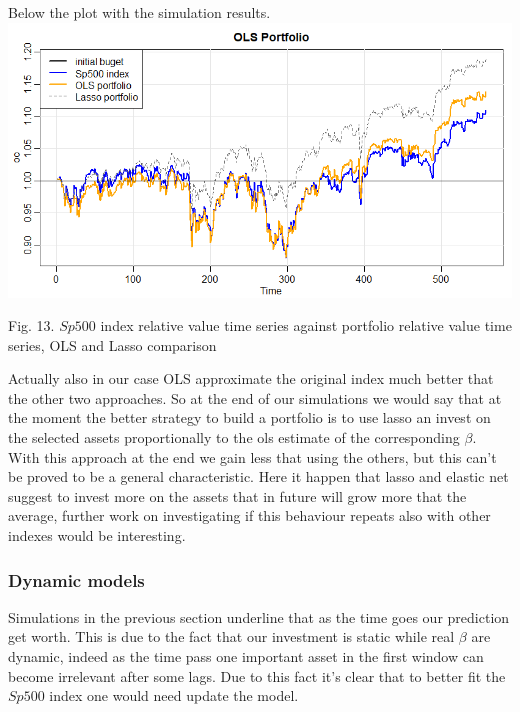 \documentclass{article}%
\begin{document}
Below the plot with the simulation results.
\\

\includegraphics[scale=0.55]{olsportfolio}
\begin{center}
\begin{small}
Fig. 13. $Sp500$ index relative value time series against portfolio relative value time series, OLS and Lasso comparison
\\

\end{small}
\end{center}


Actually also in our case OLS approximate the original index much better that the other two approaches. So at the end of our simulations we would say that at the moment the better strategy to build a portfolio is to use lasso an invest on the selected assets proportionally to the ols estimate of the corresponding $\beta$. 
With this approach at the end we gain less that using the others, but this can't be proved to be a general characteristic. Here it happen that lasso and elastic net suggest to invest more on the assets that in future will grow more that the average, further work on investigating if this behaviour repeats also with other indexes would be interesting.

\subsubsection{Dynamic models}

Simulations in the previous section underline that as the time goes our prediction get worth. This is due to the fact that our investment is static while real $\beta$ are dynamic, indeed as the time pass one important asset in the first window can become irrelevant after some lags. Due to this fact it's clear that to better fit the $Sp500$ index one would need update the model.
\end{document}
